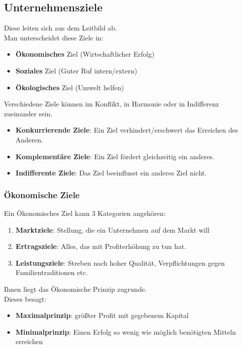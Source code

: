\documentclass[asp1.tex]{subfiles}
\begin{document}
\subsection{Unternehmensziele}
Diese leiten sich aus dem Leitbild ab. \\
Man unterscheidet diese Ziele in:
\begin{itemize}
    \item \textbf{Ökonomisches} Ziel (Wirtschaftlicher Erfolg)
    \item \textbf{Soziales} Ziel (Guter Ruf intern/extern)
    \item \textbf{Ökologisches} Ziel (Umwelt helfen)
\end{itemize}
Verschiedene Ziele können im Konflikt, in Harmonie oder in Indifferenz zueinander sein.  \\
\begin{itemize}
    \item \textbf{Konkurrierende Ziele}: Ein Ziel verhindert/erschwert das Erreichen des Anderen.
    \item \textbf{Komplementäre Ziele}: Ein Ziel fördert gleichzeitig ein anderes.
    \item \textbf{Indifferente Ziele}: Das Ziel beeinflusst ein anderes Ziel nicht.
\end{itemize}

\subsubsection{Ökonomische Ziele}
Ein Ökonomisches Ziel kann 3 Kategorien angehören: \\
\begin{enumerate}
    \item \textbf{Marktziele}: Stellung, die ein Unternehmen auf dem Markt will
    \item \textbf{Ertragsziele}: Alles, das mit Profiterhöhung zu tun hat.
    \item \textbf{Leistungsziele}: Streben  nach hoher Qualität, Verpflichtungen gegen Familientraditionen etc. \\
\end{enumerate}
Ihnen liegt das Ökonomische Prinzip zugrunde. \\
Dieses besagt: \\
\begin{itemize}
    \item \textbf{Maximalprinzip}: größter  Profit mit gegebenem Kapital
    \item \textbf{Minimalprinzip}: Einen Erfolg so wenig wie möglich benötigten Mitteln erreichen
\end{itemize}
\end{document}
